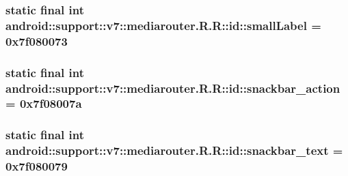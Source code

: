 \hypertarget{classandroid_1_1support_1_1v7_1_1mediarouter_1_1_r_1_1id_474a98582622a8489162a76a4e5e7591}{
\subsubsection[{smallLabel}]{\setlength{\rightskip}{0pt plus 5cm}static final int android::support::v7::mediarouter.R.R::id::smallLabel = 0x7f080073}}
\label{classandroid_1_1support_1_1v7_1_1mediarouter_1_1_r_1_1id_474a98582622a8489162a76a4e5e7591}


\hypertarget{classandroid_1_1support_1_1v7_1_1mediarouter_1_1_r_1_1id_679a64379888be7182e7d796b3d0dc31}{
\subsubsection[{snackbar\_\-action}]{\setlength{\rightskip}{0pt plus 5cm}static final int android::support::v7::mediarouter.R.R::id::snackbar\_\-action = 0x7f08007a}}
\label{classandroid_1_1support_1_1v7_1_1mediarouter_1_1_r_1_1id_679a64379888be7182e7d796b3d0dc31}


\hypertarget{classandroid_1_1support_1_1v7_1_1mediarouter_1_1_r_1_1id_19911a4b87c4977590f815b06f299ebd}{
\subsubsection[{snackbar\_\-text}]{\setlength{\rightskip}{0pt plus 5cm}static final int android::support::v7::mediarouter.R.R::id::snackbar\_\-text = 0x7f080079}}
\label{classandroid_1_1support_1_1v7_1_1mediarouter_1_1_r_1_1id_19911a4b87c4977590f815b06f299ebd}



